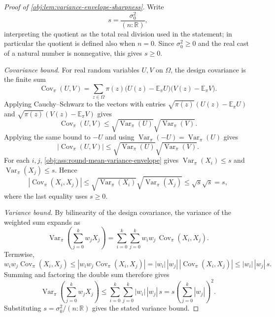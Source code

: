 \documentclass[11pt]{article}
\begin{document}
\begin{proof}[Proof of \cref{obj:lem:variance-envelope-sharpness}]
Write
\[
s=\frac{\sigma_0^2}{(n:\mathbb R)},
\]
interpreting the quotient as the total real division used in the statement; in particular the quotient is defined also when \(n=0\). Since \(\sigma_0^2\ge0\) and the real cast of a natural number is nonnegative, this gives \(s\ge0\).

\emph{Covariance bound.}
For real random variables \(U,V\) on \(\Omega\), the design covariance is the finite sum
\[
\operatorname{Cov}_\pi(U,V)
=
\sum_{z\in\Omega}\pi(z)\bigl(U(z)-\mathbb E_\pi U\bigr)\bigl(V(z)-\mathbb E_\pi V\bigr).
\]
Applying Cauchy--Schwarz to the vectors with entries \(\sqrt{\pi(z)}(U(z)-\mathbb E_\pi U)\) and \(\sqrt{\pi(z)}(V(z)-\mathbb E_\pi V)\) gives
\[
\operatorname{Cov}_\pi(U,V)
\le
\sqrt{\operatorname{Var}_\pi(U)}
\sqrt{\operatorname{Var}_\pi(V)}.
\]
Applying the same bound to \(-U\) and using \(\operatorname{Var}_\pi(-U)=\operatorname{Var}_\pi(U)\) gives
\[
|\operatorname{Cov}_\pi(U,V)|
\le
\sqrt{\operatorname{Var}_\pi(U)}
\sqrt{\operatorname{Var}_\pi(V)}.
\] %
For each \(i,j\), \cref{obj:ass:round-mean-variance-envelope} gives
\(\operatorname{Var}_\pi(X_i)\le s\) and \(\operatorname{Var}_\pi(X_j)\le s\). Hence
\[
|\operatorname{Cov}_\pi(X_i,X_j)|
\le
\sqrt{\operatorname{Var}_\pi(X_i)}\sqrt{\operatorname{Var}_\pi(X_j)}
\le
\sqrt{s}\sqrt{s}
=
s,
\]
where the last equality uses \(s\ge0\). %

\emph{Variance bound.}
By bilinearity of the design covariance, the variance of the weighted sum expands as
\[
\operatorname{Var}_\pi\!\left(\sum_{j=0}^k w_jX_j\right)
=
\sum_{i=0}^k\sum_{j=0}^k
w_iw_j\,\operatorname{Cov}_\pi(X_i,X_j).
\]
Termwise,
\[
w_iw_j\operatorname{Cov}_\pi(X_i,X_j)
\le |w_iw_j\operatorname{Cov}_\pi(X_i,X_j)|
= |w_i|\,|w_j|\,|\operatorname{Cov}_\pi(X_i,X_j)|
\le |w_i|\,|w_j|\,s.
\]
Summing and factoring the double sum therefore gives
\[
\operatorname{Var}_\pi\!\left(\sum_{j=0}^k w_jX_j\right)
\le
\sum_{i=0}^k\sum_{j=0}^k |w_i|\,|w_j|\,s
=
s\left(\sum_{j=0}^k |w_j|\right)^2.
\] %
Substituting \(s=\sigma_0^2/(n:\mathbb R)\) gives the stated variance bound.


\end{proof}
\end{document}
